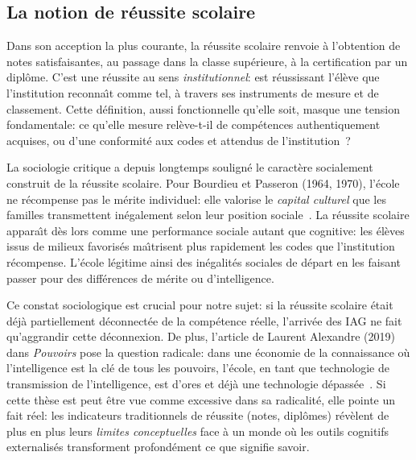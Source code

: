 \subsection{La notion de r\'eussite scolaire}

Dans son acception la plus courante, la r\'eussite scolaire renvoie \`a l'obtention de notes satisfaisantes, au passage dans la classe sup\'erieure, \`a la certification par un dipl\^ome.
C'est une r\'eussite au sens \emph{institutionnel}: est r\'eussissant l'\'el\`eve que l'institution reconna\^\i t comme tel, \`a travers ses instruments de mesure et de classement.
Cette d\'efinition, aussi fonctionnelle qu'elle soit, masque une tension fondamentale: ce qu'elle mesure rel\`eve-t-il de comp\'etences authentiquement acquises, ou d'une conformit\'e aux codes et attendus de l'institution~?

La sociologie critique a depuis longtemps soulign\'e le caract\`ere socialement construit de la r\'eussite scolaire. 
Pour Bourdieu et Passeron (1964, 1970), l'\'ecole ne r\'ecompense pas le m\'erite individuel: elle valorise le \emph{capital culturel} que les familles transmettent in\'egalement selon leur position sociale~\cite{bourdieu1970}. 
La r\'eussite scolaire appara\^\i t d\`es lors comme une performance sociale autant que cognitive: les \'el\`eves issus de milieux favoris\'es ma\^\i trisent plus rapidement les codes que l'institution r\'ecompense. 
L'\'ecole l\'egitime ainsi des in\'egalit\'es sociales de d\'epart en les faisant passer pour des diff\'erences de m\'erite ou d'intelligence.

Ce constat sociologique est crucial pour notre sujet: si la r\'eussite scolaire \'etait d\'ej\`a partiellement d\'econnect\'ee de la comp\'etence r\'eelle, l'arriv\'ee des IAG ne fait qu'aggrandir cette d\'econnexion. 
De plus, l'article de Laurent Alexandre (2019) dans \emph{Pouvoirs} pose la question radicale: dans une \og{}\'economie de la connaissance\fg{} o\`u l'intelligence est la cl\'e de tous les pouvoirs, l'\'ecole, \og{}en tant que technologie de transmission de l'intelligence, est d'ores et d\'ej\`a une technologie d\'epass\'ee\fg{}~\cite{alexandre2019}.
Si cette th\`ese est peut \^etre vue comme excessive dans sa radicalit\'e, elle pointe un fait r\'eel: les indicateurs traditionnels de r\'eussite (notes, dipl\^omes) r\'ev\`elent de plus en plus leurs \emph{limites conceptuelles} face \`a un monde o\`u les outils cognitifs externalis\'es transforment profond\'ement ce que signifie \og{}savoir\fg{}.


